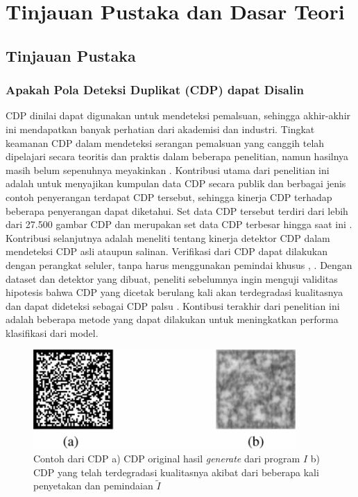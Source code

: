 \chapter{Tinjauan Pustaka dan Dasar Teori}

\section{Tinjauan Pustaka}

\subsection{Apakah Pola Deteksi Duplikat (CDP) dapat Disalin}
CDP dinilai dapat digunakan untuk mendeteksi pemalsuan, sehingga akhir-akhir ini mendapatkan banyak perhatian dari akademisi dan industri. Tingkat keamanan CDP dalam mendeteksi serangan pemalsuan yang canggih telah dipelajari secara teoritis dan praktis dalam beberapa penelitian, namun hasilnya masih belum sepenuhnya meyakinkan \cite{PICARDCANCOPYDETECTIONPATTERN}. Kontribusi utama dari penelitian ini adalah untuk menyajikan kumpulan data CDP secara publik dan berbagai jenis contoh penyerangan terdapat CDP tersebut, sehingga kinerja CDP terhadap beberapa penyerangan dapat diketahui. Set data CDP tersebut terdiri dari lebih dari 27.500 gambar CDP dan merupakan set data CDP terbesar hingga saat ini \cite{PICARDCANCOPYDETECTIONPATTERN}. Kontribusi selanjutnya adalah meneliti tentang kinerja detektor CDP dalam mendeteksi CDP asli ataupun salinan. Verifikasi dari CDP dapat dilakukan dengan perangkat seluler, tanpa harus menggunakan pemindai khusus \cite{WONG2017}, \cite{SCHRAML2018REAL}. Dengan dataset dan detektor yang dibuat, peneliti sebelumnya ingin menguji validitas hipotesis bahwa CDP yang dicetak berulang kali akan terdegradasi kualitasnya dan dapat dideteksi sebagai CDP palsu \cite{PICARDCANCOPYDETECTIONPATTERN}. Kontibusi terakhir dari penelitian ini adalah beberapa metode yang dapat dilakukan untuk meningkatkan performa klasifikasi dari model. 

\begin{figure}[h]
	\centering
	\includegraphics[width=10cm]{contents/chapter-2/2-cdporivsfake.png}
	\caption{Contoh dari CDP a) CDP original hasil \emph{generate} dari program $I$ b) CDP yang telah terdegradasi kualitasnya akibat dari beberapa kali penyetakan dan pemindaian $\widetilde{I}$ \cite{PICARDCANCOPYDETECTIONPATTERN}}
	\label{Fig: 2-cdporivsfake}
\end{figure}

